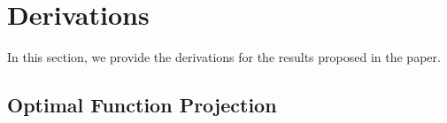 \documentclass[twoside]{article} \usepackage{aistats2017}
\theoremstyle{definition}
\theoremstyle{theorem}
\newtheorem{theorem}{Theorem}[section]
\newcommand{\rv}[1]{{#1}}
\newcommand{\warn}[1]{{\color{red} #1}}
\newcommand{\hatmuX}{\hat{\mu}_{\rv{X}}}
\newcommand{\hatmuY}{\hat{\mu}_{\rv{Y}}}
\newcommand{\hatCxly}{\hat{C}_{\rv{X} | \rv{Y}}}
\begin{document}
%			
%		

\section{Derivations}
\label{sec:derivations}

	In this section, we provide the derivations for the results proposed in the paper.

	\subsection{Optimal Function Projection}
	\label{sec:derivations:optimal_function_projection}
\end{document}
